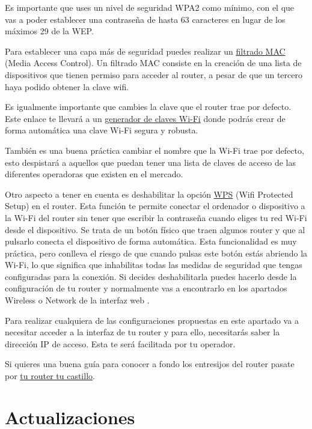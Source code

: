 \documentclass[
  spanish,
  a4paper,
  openany]{book}
\begin{document}
Es importante que uses un nivel de seguridad WPA2 como mínimo, con el que vas a poder establecer una contraseña de hasta 63 caracteres en lugar de los máximos 29 de la WEP.

Para establecer una capa más de seguridad puedes realizar un \href{https://es.wikipedia.org/wiki/Filtrado_MAC}{filtrado MAC} (Media Access Control). Un filtrado MAC consiste en la creación de una lista de dispositivos que tienen permiso para acceder al router, a pesar de que un tercero haya podido obtener la clave wifi.

Es igualmente importante que cambies la clave que el router trae por defecto. Este enlace te llevará a un \href{https://bandaancha.eu/generador-claves-wifi}{generador de claves Wi-Fi} donde podrás crear de forma automática una clave Wi-Fi segura y robusta.

También es una buena práctica cambiar el nombre que la Wi-Fi trae por defecto, esto despistará a aquellos que puedan tener una lista de claves de acceso de las diferentes operadoras que existen en el mercado.

Otro aspecto a tener en cuenta es deshabilitar la opción \href{https://es.wikipedia.org/wiki/Wi-Fi_Protected_Setup}{WPS} (Wifi Protected Setup) en el router. Esta función te permite conectar el ordenador o dispositivo a la Wi-Fi del router sin tener que escribir la contraseña cuando eliges tu red Wi-Fi desde el dispositivo. Se trata de un botón físico que traen algunos router y que al pulsarlo conecta el dispositivo de forma automática. Esta funcionalidad es muy práctica, pero conlleva el riesgo de que cuando pulsas este botón estás abriendo la Wi-Fi, lo que significa que inhabilitas todas las medidas de seguridad que tengas configuradas para la conexión. Si decides deshabilitarla puedes hacerlo desde la configuración de tu router y normalmente vas a encontrarlo en los apartados Wireless o Network de la interfaz web \citep{XATAKA-wps}.

Para realizar cualquiera de las configuraciones propuestas en este apartado va a necesitar acceder a la interfaz de tu router y para ello, necesitarás saber la dirección IP de acceso. Esta te será facilitada por tu operador.

Si quieres una buena guía para conocer a fondo los entresijos del router pasate por \href{https://www.osi.es/sites/default/files/docs/guia_router/osi-guia-tu-router-tu-castillo.pdf}{tu router tu castillo}.

\hypertarget{actualizaciones}{%
\section{Actualizaciones}\label{actualizaciones}}
\end{document}
